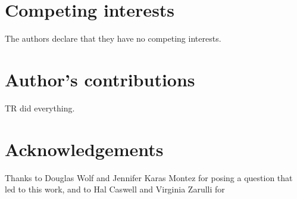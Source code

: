 \documentclass{bmcart}
\begin{document}


\begin{backmatter}

\section*{Competing interests}
  The authors declare that they have no competing interests.

\section*{Author's contributions}
    TR did everything.

\section*{Acknowledgements}
  Thanks to Douglas Wolf and Jennifer Karas Montez for posing a question that led to this work, and to Hal Caswell and Virginia Zarulli for 



\end{backmatter}
\end{document}
